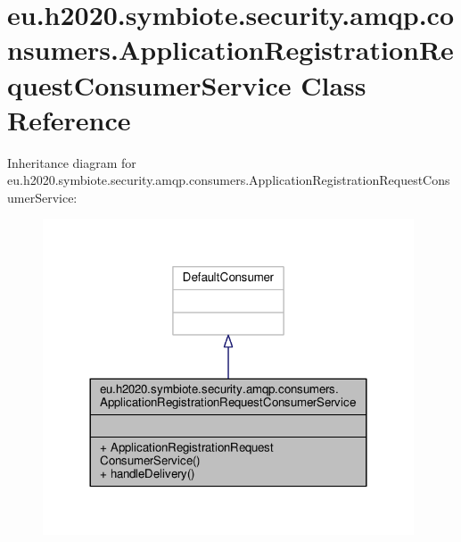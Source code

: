 \hypertarget{classeu_1_1h2020_1_1symbiote_1_1security_1_1amqp_1_1consumers_1_1ApplicationRegistrationRequestConsumerService}{}\section{eu.\+h2020.\+symbiote.\+security.\+amqp.\+consumers.\+Application\+Registration\+Request\+Consumer\+Service Class Reference}
\label{classeu_1_1h2020_1_1symbiote_1_1security_1_1amqp_1_1consumers_1_1ApplicationRegistrationRequestConsumerService}


Inheritance diagram for eu.\+h2020.\+symbiote.\+security.\+amqp.\+consumers.\+Application\+Registration\+Request\+Consumer\+Service\+:
\nopagebreak
\begin{figure}[H]
\begin{center}
\leavevmode
\includegraphics[width=312pt]{classeu_1_1h2020_1_1symbiote_1_1security_1_1amqp_1_1consumers_1_1ApplicationRegistrationRequestConsumerService__inherit__graph}
\end{center}
\end{figure}


